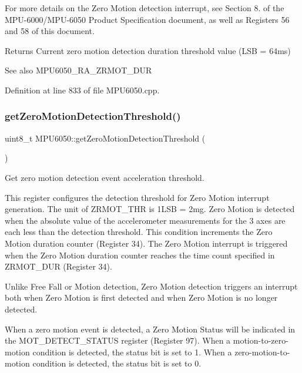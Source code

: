 For more details on the Zero Motion detection interrupt, see Section 8. of the M\+P\+U-\/6000/\+M\+P\+U-\/6050 Product Specification document, as well as Registers 56 and 58 of this document.

\begin{DoxyReturn}{Returns}
Current zero motion detection duration threshold value (L\+SB = 64ms) 
\end{DoxyReturn}
\begin{DoxySeeAlso}{See also}
M\+P\+U6050\+\_\+\+R\+A\+\_\+\+Z\+R\+M\+O\+T\+\_\+\+D\+UR 
\end{DoxySeeAlso}


Definition at line 833 of file M\+P\+U6050.\+cpp.

\mbox{\label{classMPU6050_ad941c1e844dc9230675c115734599ea3}} 
\subsubsection{\texorpdfstring{getZeroMotionDetectionThreshold()}{getZeroMotionDetectionThreshold()}}
{\footnotesize\ttfamily uint8\+\_\+t M\+P\+U6050\+::get\+Zero\+Motion\+Detection\+Threshold (\begin{DoxyParamCaption}{ }\end{DoxyParamCaption})}



Get zero motion detection event acceleration threshold. 

This register configures the detection threshold for Zero Motion interrupt generation. The unit of Z\+R\+M\+O\+T\+\_\+\+T\+HR is 1L\+SB = 2mg. Zero Motion is detected when the absolute value of the accelerometer measurements for the 3 axes are each less than the detection threshold. This condition increments the Zero Motion duration counter (Register 34). The Zero Motion interrupt is triggered when the Zero Motion duration counter reaches the time count specified in Z\+R\+M\+O\+T\+\_\+\+D\+UR (Register 34).

Unlike Free Fall or Motion detection, Zero Motion detection triggers an interrupt both when Zero Motion is first detected and when Zero Motion is no longer detected.

When a zero motion event is detected, a Zero Motion Status will be indicated in the M\+O\+T\+\_\+\+D\+E\+T\+E\+C\+T\+\_\+\+S\+T\+A\+T\+US register (Register 97). When a motion-\/to-\/zero-\/motion condition is detected, the status bit is set to 1. When a zero-\/motion-\/to-\/ motion condition is detected, the status bit is set to 0.

